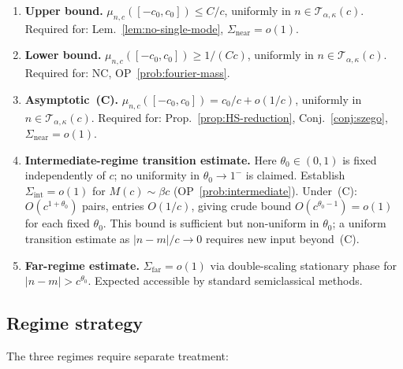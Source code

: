 \documentclass[12pt,a4paper]{amsart}
\theoremstyle{definition}
\theoremstyle{remark}
\begin{document}
\begin{enumerate}[\rm(A)]
\item \textbf{Upper bound.}
  $\mu_{n,c}([-c_0,c_0])\le C/c$,
  uniformly in
  $n\in\mathcal{T}_{\alpha,\kappa}(c)$.
  Required for:
  Lem.~\ref{lem:no-single-mode},
  $\Sigma_{\mathrm{near}}=o(1)$.

\item \textbf{Lower bound.}
  $\mu_{n,c}([-c_0,c_0])\ge 1/(Cc)$,
  uniformly in
  $n\in\mathcal{T}_{\alpha,\kappa}(c)$.
  Required for: NC,
  OP~\ref{prob:fourier-mass}.

\item \textbf{Asymptotic~(C).}
  $\mu_{n,c}([-c_0,c_0])
  = c_0/c + o(1/c)$,
  uniformly in
  $n\in\mathcal{T}_{\alpha,\kappa}(c)$.
  Required for:
  Prop.~\ref{prop:HS-reduction},
  Conj.~\ref{conj:szego},
  $\Sigma_{\mathrm{near}}=o(1)$.

\item[\rm(D-int)]
  \textbf{Intermediate-regime
  transition estimate.}
  Here $\theta_0\in(0,1)$ is fixed
  independently of $c$; no uniformity
  in $\theta_0\to 1^-$ is claimed.
  Establish
  $\Sigma_{\mathrm{int}}=o(1)$
  for $M(c)\sim\beta c$
  (OP~\ref{prob:intermediate}).
  Under~(C): $O(c^{1+\theta_0})$
  pairs, entries $O(1/c)$, giving
  crude bound
  $O(c^{\theta_0-1})=o(1)$
  for each fixed $\theta_0$.
  This bound is sufficient but
  non-uniform in $\theta_0$;
  a uniform transition estimate
  as $|n-m|/c\to 0$ requires
  new input beyond~(C).

\item[\rm(D-far)]
  \textbf{Far-regime estimate.}
  $\Sigma_{\mathrm{far}}=o(1)$
  via double-scaling stationary phase
  for $|n-m|>c^{\theta_0}$.
  Expected accessible by standard
  semiclassical methods.
\end{enumerate}

\subsection{Regime strategy}

The three regimes require separate
treatment:
\end{document}
